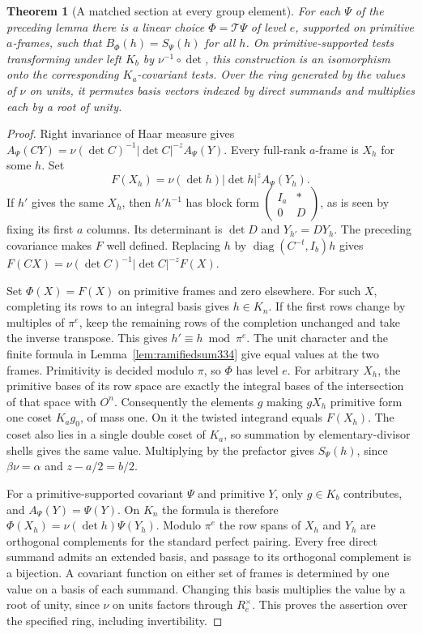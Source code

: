 \documentclass[a4paper,11pt]{article}
\newtheorem{theorem}[proposition]{Theorem}
\theoremstyle{definition}
\theoremstyle{remark}
\numberwithin{equation}{section}
\begin{document}
\begin{theorem}[A matched section at every group element]\label{thm:matchingframe334}
For each \(\Psi\) of the preceding lemma there is a linear choice
\(\Phi=\mathcal T\Psi\) of level \(e\), supported on primitive
\(a\)-frames, such that \(B_\Phi(h)=S_\Psi(h)\) for all \(h\).
On primitive-supported tests transforming under left \(K_b\) by
\(\nu^{-1}\circ\det\), this construction is an isomorphism onto the
corresponding \(K_a\)-covariant tests. Over the ring generated by the
values of \(\nu\) on units, it permutes basis vectors indexed by direct
summands and multiplies each by a root of unity.
\end{theorem}
\begin{proof}
Right invariance of Haar measure gives
\(A_\Psi(CY)=\nu(\det C)^{-1}|\det C|^{-z}A_\Psi(Y)\).
Every full-rank \(a\)-frame is \(X_h\) for some \(h\). Set
\[
       F(X_h)=\nu(\det h)|\det h|^z A_\Psi(Y_h).
\]
If \(h'\) gives the same \(X_h\), then \(h'h^{-1}\) has block form
\(\left(\begin{smallmatrix}I_a&*\\0&D\end{smallmatrix}\right)\),
as is seen by fixing its first \(a\) columns. Its determinant is
\(\det D\) and \(Y_{h'}=D Y_h\). The preceding covariance makes \(F\)
well defined. Replacing \(h\) by \(\operatorname{diag}(C^{-t},I_b)h\)
gives \(F(CX)=\nu(\det C)^{-1}|\det C|^{-z}F(X)\).

Set \(\Phi(X)=F(X)\) on primitive frames and zero elsewhere. For such
\(X\), completing its rows to an integral basis gives \(h\in K_n\).
If the first rows change by multiples of \(\pi^e\), keep the remaining
rows of the completion unchanged and take the inverse transpose. This
gives \(h'\equiv h\bmod\pi^e\). The unit character and the finite formula
in Lemma~\ref{lem:ramifiedsum334} give equal values at the two frames.
Primitivity is decided modulo \(\pi\), so \(\Phi\) has level \(e\).
For arbitrary \(X_h\), the primitive bases of its row space are exactly
the integral bases of the intersection of that space with \(O^n\).
Consequently the elements \(g\) making \(gX_h\) primitive form one
coset \(K_a g_0\), of mass one. On it the twisted integrand equals
\(F(X_h)\). The coset also lies in a single double coset of \(K_a\),
so summation by elementary-divisor shells gives the same value.
Multiplying by the prefactor gives \(S_\Psi(h)\), since
\(\beta\nu=\alpha\) and \(z-a/2=b/2\).

For a primitive-supported covariant \(\Psi\) and primitive \(Y\),
only \(g\in K_b\) contributes, and \(A_\Psi(Y)=\Psi(Y)\).
On \(K_n\) the formula is therefore
\(\Phi(X_h)=\nu(\det h)\Psi(Y_h)\). Modulo \(\pi^e\) the row spans
of \(X_h\) and \(Y_h\) are orthogonal complements for the standard
perfect pairing. Every free direct summand admits an extended basis,
and passage to its orthogonal complement is a bijection. A covariant
function on either set of frames is determined by one value on a basis
of each summand. Changing this basis multiplies the value by a root
of unity, since \(\nu\) on units factors through \(R_e^\times\).
This proves the assertion over the specified ring, including invertibility.
\end{proof}
\end{document}
